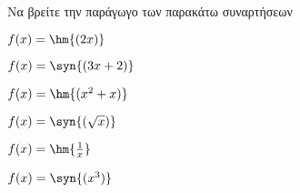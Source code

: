 Να βρείτε την παράγωγο των παρακάτω συναρτήσεων
\begin{multicols}{2}
\begin{alist}
\item $ f(x)=\hm{(2x)} $
\item $ f(x)=\syn{(3x+2)} $
\item $ f(x)=\hm{(x^2+x)} $
\item $ f(x)=\syn{(\sqrt{x})} $
\item $ f(x)=\hm{\frac{1}{x}} $
\item $ f(x)=\syn{(x^3)} $
\end{alist}
\end{multicols}
